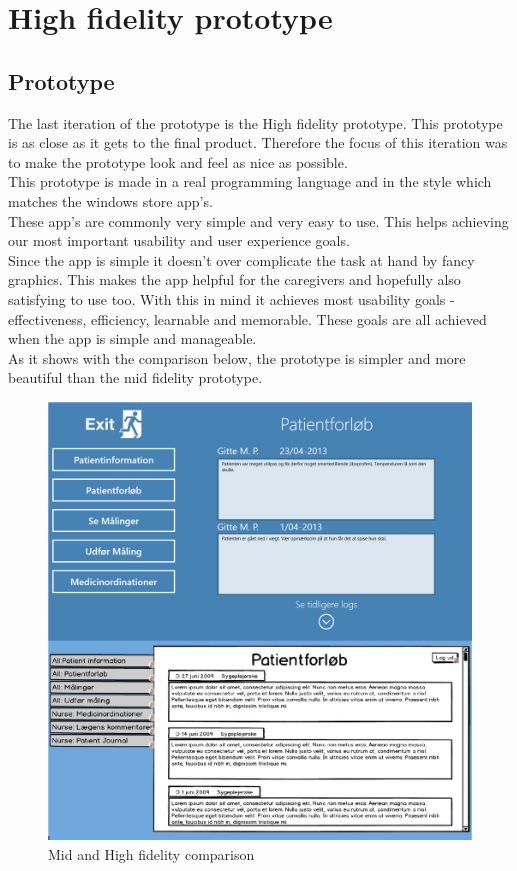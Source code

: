 \chapter{High fidelity prototype}


\section{Prototype}
The last iteration of the prototype is the High fidelity prototype. This prototype is as close as it gets to the final product. Therefore the focus of this iteration was to make the prototype look and feel as nice as possible.\\
This prototype is made in a real programming language and in the style which matches the windows store app's.\\
These app's are commonly very simple and very easy to use. This helps achieving our most important usability and user experience goals.\\
Since the app is simple it doesn't over complicate the task at hand by fancy graphics. This makes the app helpful for the caregivers and hopefully also satisfying to use too. With this in mind it achieves most usability goals - effectiveness, efficiency, learnable and memorable. These goals are all achieved when the app is simple and manageable.\\
As it shows with the comparison below, the prototype is simpler and more beautiful than the mid fidelity prototype.\\
\begin{figure}[H]
\centering
\includegraphics[width=.65\textwidth]{billeder/midhigh_compare.png}
\caption{Mid and High fidelity comparison}
\end{figure}
